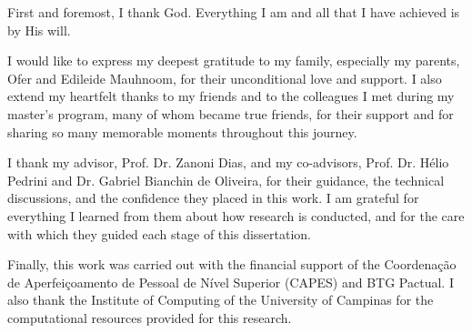 \documentclass[Ingles]{ic-tese-v3}
\begin{document}

First and foremost, I thank God. Everything I am and all that I have achieved is by His will.

I would like to express my deepest gratitude to my family, especially my parents, Ofer and Edileide Mauhnoom, for their unconditional love and support. I also extend my heartfelt thanks to my friends and to the colleagues I met during my master's program, many of whom became true friends, for their support and for sharing so many memorable moments throughout this journey.

I thank my advisor, Prof. Dr. Zanoni Dias, and my co-advisors, Prof. Dr. Hélio Pedrini and Dr. Gabriel Bianchin de Oliveira, for their guidance, the technical discussions, and the confidence they placed in this work. I am grateful for everything I learned from them about how research is conducted, and for the care with which they guided each stage of this dissertation.

Finally, this work was carried out with the financial support of the Coordenação de Aperfeiçoamento de Pessoal de Nível Superior (CAPES) and BTG Pactual. I also thank the Institute of Computing of the University of Campinas for the computational resources provided for this research.




\end{document}
